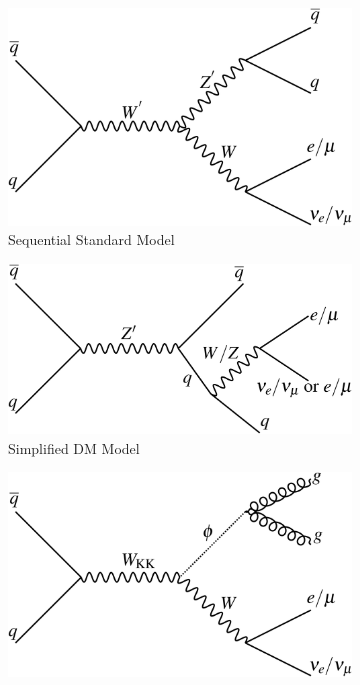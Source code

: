 \begin{figure}[h]
    \centering
    \begin{subfigure}[h]{0.4\linewidth}
    \includegraphics[scale=0.06]{figs/ch6/feynman/fig_01a.png}%
    \caption{Sequential Standard Model}
    \end{subfigure}
    \hfill
    \begin{subfigure}[h]{0.4\linewidth}
    \includegraphics[scale=0.06]{figs/ch6/feynman/fig_01b.png}%
    \caption{Simplified DM Model}
    \end{subfigure}
    \hfill
    \begin{subfigure}[h]{0.4\linewidth}
    \includegraphics[scale=0.06]{figs/ch6/feynman/fig_01c.png}%

\end{subfigure}
\end{figure}
